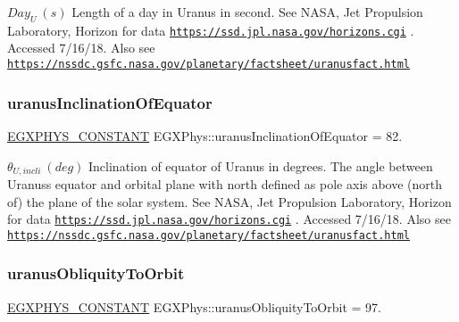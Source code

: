 $ Day_{U} \ (s)$ Length of a day in Uranus in second. See N\+A\+SA, Jet Propulsion Laboratory, Horizon for data \href{https://ssd.jpl.nasa.gov/horizons.cgi}{\tt https\+://ssd.\+jpl.\+nasa.\+gov/horizons.\+cgi} . Accessed 7/16/18. Also see \href{https://nssdc.gsfc.nasa.gov/planetary/factsheet/uranusfact.html}{\tt https\+://nssdc.\+gsfc.\+nasa.\+gov/planetary/factsheet/uranusfact.\+html} \mbox{\label{group___e_g_x_phys-_constants-_astrophysics-_solar_system-_uranus-_orbit_gaf67afd76c304a2c07c4f9aafc26ace8b}} 
\subsubsection{\texorpdfstring{uranus\+Inclination\+Of\+Equator}{uranusInclinationOfEquator}}
{\footnotesize\ttfamily \mbox{\hyperlink{group___e_g_x_phys-_constants-_macros_ga76980d288494ce1714c9ac68a95ba702}{E\+G\+X\+P\+H\+Y\+S\+\_\+\+C\+O\+N\+S\+T\+A\+NT}} E\+G\+X\+Phys\+::uranus\+Inclination\+Of\+Equator = 82.}

$ \theta_{U,incli} \ (deg)$ Inclination of equator of Uranus in degrees. The angle between Uranus\textquotesingle{}s equator and orbital plane with north defined as pole axis above (north of) the plane of the solar system. See N\+A\+SA, Jet Propulsion Laboratory, Horizon for data \href{https://ssd.jpl.nasa.gov/horizons.cgi}{\tt https\+://ssd.\+jpl.\+nasa.\+gov/horizons.\+cgi} . Accessed 7/16/18. Also see \href{https://nssdc.gsfc.nasa.gov/planetary/factsheet/uranusfact.html}{\tt https\+://nssdc.\+gsfc.\+nasa.\+gov/planetary/factsheet/uranusfact.\+html} \mbox{\label{group___e_g_x_phys-_constants-_astrophysics-_solar_system-_uranus-_orbit_ga6e5df4b76797d267673db179028f8da8}} 
\subsubsection{\texorpdfstring{uranus\+Obliquity\+To\+Orbit}{uranusObliquityToOrbit}}
{\footnotesize\ttfamily \mbox{\hyperlink{group___e_g_x_phys-_constants-_macros_ga76980d288494ce1714c9ac68a95ba702}{E\+G\+X\+P\+H\+Y\+S\+\_\+\+C\+O\+N\+S\+T\+A\+NT}} E\+G\+X\+Phys\+::uranus\+Obliquity\+To\+Orbit = 97.}

